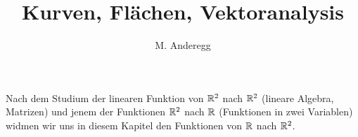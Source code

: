 \documentclass[a4paper, 11pt]{article}
\begin{document}
\title{Kurven, Flächen, Vektoranalysis}
\author{M. Anderegg}
\date{} %
\maketitle 
Nach dem Studium der linearen Funktion von $\mathbb{R}^2$ nach $\mathbb{R}^2$ (lineare Algebra, Matrizen) und jenem der Funktionen $\mathbb{R}^2$ nach $\mathbb{R}$ (Funktionen in zwei Variablen) widmen wir uns in diesem Kapitel den Funktionen von $\mathbb{R}$ nach $\mathbb{R}^2$.




\clearpage

\clearpage

\clearpage

\clearpage





	
\end{document}
